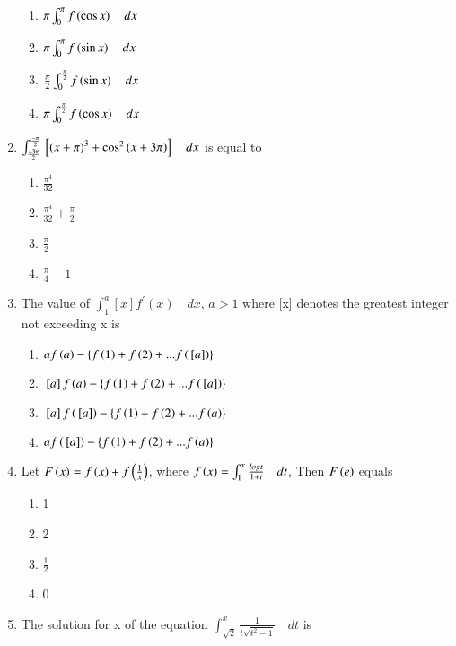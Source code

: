 \documentclass[journal]{IEEEtran}
\begin{document}
\begin{enumerate}
\begin{enumerate}
		         \item $\pi \int_{0}^{\pi} f\left(\cos x\right) \quad dx$
		         \item $\pi \int_{0}^{\pi} f\left(\sin x\right) \quad dx$
		         \item $\frac{\pi}{2} \int_{0}^{\frac{\pi}{2}} f\left(\sin x\right) \quad dx$
		         \item $\pi \int_{0}^{\frac{\pi}{2}} f\left(\cos x\right) \quad dx$
		    \end{enumerate}
	     \item
		    $\int_{\frac{-3\pi}{2}}^{\frac{-\pi}{2}} {}\left[\left(x+\pi\right)^{3}+\cos^{2}\left(x+3\pi\right)\right] \quad dx$ is equal to
		    \hfill {} 
		   \begin{enumerate}
		        \item $\frac{\pi^{4}}{32}$
		        \item $\frac{\pi^{4}}{32}+\frac{\pi}{2}$
		        \item $\frac{\pi}{2}$
		        \item $\frac{\pi}{4}-1$
		   \end{enumerate}
	    \item
		    The value of $\int_{1}^{a} [x]f^{'}(x) \quad dx$, $a>1$ where [x] denotes the greatest integer not exceeding x is
		   \hfill {}
		   \begin{enumerate}
		       \item $af\left(a\right)-\left\{f\left(1\right)+f\left(2\right)+...f\left({}\left[a\right]\right)\right\}$
		       \item ${}\left[a\right]f\left(a\right)-\left\{f\left(1\right)+f\left(2\right)+...f\left({}\left[a\right]\right)\right\}$
		       \item ${}\left[a\right]f\left({}\left[a\right]\right)-\left\{f\left(1\right)+f\left(2\right)+...f\left(a\right)\right\}$
		       \item $af\left({}\left[a\right]\right)-\left\{f\left(1\right)+f\left(2\right)+...f\left(a\right)\right\}$
		   \end{enumerate}
	   \item 
		    Let $F\left(x\right)=f\left(x\right)+f\left(\frac{1}{x}\right)$, where $f\left(x\right)=\int_{1}^{x} \frac{logt}{1+t} \quad dt$, Then $F\left(e\right)$ equals
		    \hfill {} 
		   \begin{enumerate}
		      \item 1
		      \item 2
		      \item $\frac{1}{2}$
		      \item 0
		   \end{enumerate}  
	   \item 
    		    The solution for x of the equation $\int_{\sqrt2}^{x} \frac{1}{t\sqrt{t^{2}-1}} \quad dt$ is

\end{enumerate}
\end{document}
